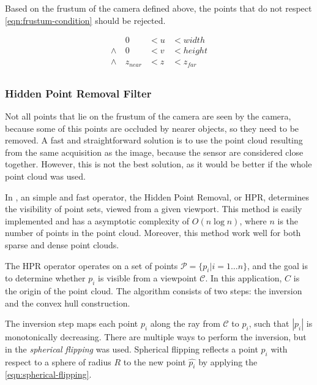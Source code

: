 Based on the frustum of the camera defined above, the points that do not respect \cref{eqn:frustum-condition} should be rejected.

\begin{equation}
    \label{eqn:frustum-condition}
    \begin{aligned}
                 & 0        & < u & < width \\
        \wedge \ & 0        & < v & < height \\
        \wedge \ & z_{near} & < z & < z_{far} \\
    \end{aligned}
\end{equation}

\subsubsection{Hidden Point Removal Filter}

Not all points that lie on the frustum of the camera are seen by the camera, because some of this points are occluded by nearer objects, so they need to be removed. A fast and straightforward solution is to use the point cloud resulting from the same acquisition as the image, because the sensor are considered close together. However, this is not the best solution, as it would be better if the whole point cloud was used.

In \cite{katz07}, an simple and fast operator, the Hidden Point Removal, or HPR, determines the visibility of point sets, viewed from a given viewport. This method is easily implemented and has a asymptotic complexity of $O(n \log n)$, where $n$ is the number of points in the point cloud. Moreover, this method work well for both sparse and dense point clouds.

The HPR operator operates on a set of points $\mathcal{P} = \{p_i | i = 1 \dots n \}$, and the goal is to determine whether $p_i$ is visible from a viewpoint $\mathcal{C}$. In this application, $C$ is the origin of the point cloud. The algorithm consists of two steps: the inversion and the convex hull construction.

The inversion step maps each point $p_i$ along the ray from $\mathcal{C}$ to $p_i$, such that $|p_i|$ is monotonically decreasing. There are multiple ways to perform the inversion, but in \cite{katz07} the \emph{spherical flipping} was used. Spherical flipping reflects a point $p_i$ with respect to a sphere of radius $R$ to the new point $\hat{p_i}$ by applying the \cref{eqn:spherical-flipping}.

